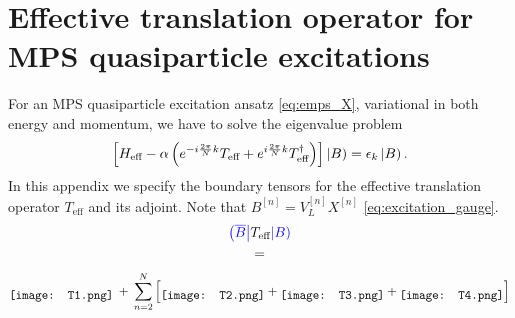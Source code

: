 \newpage
\section*{Effective translation operator for MPS quasiparticle excitations}
For an MPS quasiparticle excitation ansatz \eqref{eq:emps_X}, variational in both energy and momentum, we have to solve the eigenvalue problem
\begin{equation*}
	\left[ H_{\text{eff}} - \alpha \left( e^{-i \frac{2\pi}{N}k} T_{\text{eff}} + e^{i \frac{2\pi}{N}k} T_{\text{eff}}^{\dagger} \right) \right] 
	 \left| B \right) 
	 = \epsilon_k \left| B \right).
\end{equation*}
In this appendix we specify the boundary tensors for the effective translation operator $T_{\text{eff}}$ and its adjoint. Note that $B^{[n]} = V_L^{[n]} X^{[n]}$ \eqref{eq:excitation_gauge}. \\[1.5em]

\begin{align*}
\begin{split}
	\textcolor{blue}{\left( \overline{B} \right|} &T_{\text{eff}} \textcolor{blue}{\left| B \right)} \\
	&=
\end{split}
\end{align*}
\vspace*{-0.5cm}
\begin{equation*}
	\raisebox{-0.45\height}{\texttt{[image: T1.png]}} 
	\:+\: \sum_{n=2}^N \left[
	\raisebox{-0.45\height}{\texttt{[image: T2.png]}}
	+
	\raisebox{-0.45\height}{\texttt{[image: T3.png]}} 
	+ 
	\raisebox{-0.45\height}{\texttt{[image: T4.png]}} 
	\right]
\end{equation*}

\vspace*{2em}

